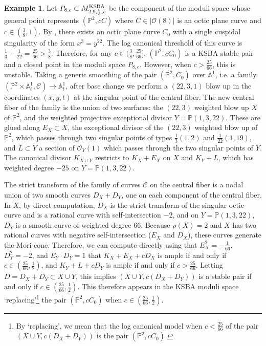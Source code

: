 \documentclass[11pt]{amsart}
\numberwithin{equation}{section}
\theoremstyle{definition}
\newtheorem{example}[theorem]{Example}
\newcommand{\KSBA}{{\rm KSBA}}
\newcommand{\bP}{\mathbb{P}}
\newcommand{\bA}{\mathbb{A}}
\newcommand{\calO}{\mathcal{O}}
\newcommand{\calC}{\mathcal C}
\begin{document}
\begin{example}\label{ex:octic}
    Let $P_{8,c} \subset M^{\KSBA}_{2,9,\frac{8}{3},c}$ be the component of the moduli space whose general point represents $(\bP^2, c C)$ where $C \in |\calO(8)|$ is an octic plane curve and $c \in (\frac{3}{8},1)$.  By \cite{Orevkov}, there exists an octic plane curve $C_0$ with a single cuspidal singularity of the form $x^3 = y^{22}$.  The log canonical threshold of this curve is $\frac{1}{3}+\frac{1}{22} = \frac{25}{66} > \frac{3}{8}$.  Therefore, for any $c \in (\frac{3}{8}, \frac{25}{66}]$, $(\bP^2, c C_0)$ is a KSBA stable pair and a closed point in the moduli space $P_{8,c}$.  However, when $c > \frac{25}{66}$, this is unstable.  Taking a generic smoothing of the pair $(\bP^2, C_0)$ over $\bA^1$, i.e. a family $(\bP^2 \times \bA^1_t,\calC) \to \bA^1_t $, after base change we perform a $(22,3,1)$  blow up in the coordinates $(x,y,t)$ at the singular point of the central fiber.  The new central fiber of the family is the union of two surfaces: the $(22,3)$ weighted blow up $X$ of $\bP^2$, and the weighted projective exceptional divisor $Y =\bP(1,3,22)$.  These are glued along $E_X \subset X$, the exceptional divisor of the $(22,3)$ weighted blow up of $\bP^2$, which passes through two singular points of types $\frac{1}{3}(1,2)$ and $\frac{1}{22}(1,19)$, and $L \subset Y$ a section of $\calO_{Y}(1)$ which passes through the two singular points of $Y$.  The canonical divisor $K_{X \cup Y}$ restricts to $K_X + E_X$ on $X$ and $K_{Y} + L$, which has weighted degree $-25$ on $Y = \bP(1,3,22)$.
    
    The strict transform of the family of curves $\calC$ on the central fiber is a nodal union of two smooth curves $D_X + D_Y$, one on each component of the central fiber.  In $X$, by direct computation, $D_X$ is the strict transform of the singular octic curve and is a rational curve with self-intersection $-2$, and on $Y = \bP(1,3,22)$, $D_Y$ is a smooth curve of weighted degree 66. Because $\rho(X) = 2$ and $X$ has two rational curves with negative self-intersection ($E_X$ and $D_X$), these curves generate the Mori cone.  Therefore, we can compute directly using that $E_X^2 = - \frac{1}{66}$, $D_Y^2 = -2$, and $E_Y \cdot D_Y = 1$ that $K_{X} + E_X + c D_X$ is ample if and only if $c \in (\frac{25}{66}, \frac{1}{2})$, and $K_Y + L + cD_Y$ is ample if and only if $c > \frac{25}{66}$.  Letting $D = D_X + D_Y \subset X\cup Y$, this implies $(X\cup Y, c(D_X + D_Y))$ is a stable pair if and only if $c \in (\frac{25}{66},\frac{1}{2})$.  This therefore appears in the KSBA moduli space `replacing'\footnote{By `replacing', we mean that the log canonical model when $c < \frac{25}{66}$ of the pair $(X\cup Y, c(D_X + D_Y))$ is the pair $(\bP^2, cC_0)$.} the pair $(\bP^2, cC_0)$ when $c \in (\frac{25}{66}, \frac{1}{2})$.  
    

\end{example}
\end{document}
